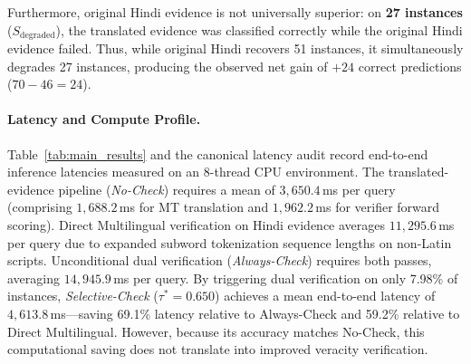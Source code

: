 Furthermore, original Hindi evidence is not universally superior: on \textbf{27 instances} ($S_{\text{degraded}}$), the translated evidence was classified correctly while the original Hindi evidence failed. Thus, while original Hindi recovers 51 instances, it simultaneously degrades 27 instances, producing the observed net gain of $+24$ correct predictions ($70 - 46 = 24$).

\paragraph{Latency and Compute Profile.}
Table~\ref{tab:main_results} and the canonical latency audit record end-to-end inference latencies measured on an 8-thread CPU environment. The translated-evidence pipeline (\emph{No-Check}) requires a mean of $3,650.4$\,ms per query (comprising $1,688.2$\,ms for MT translation and $1,962.2$\,ms for verifier forward scoring). Direct Multilingual verification on Hindi evidence averages $11,295.6$\,ms per query due to expanded subword tokenization sequence lengths on non-Latin scripts. Unconditional dual verification (\emph{Always-Check}) requires both passes, averaging $14,945.9$\,ms per query. By triggering dual verification on only 7.98\% of instances, \emph{Selective-Check} ($\tau^*=0.650$) achieves a mean end-to-end latency of $4,613.8$\,ms---saving 69.1\% latency relative to Always-Check and 59.2\% relative to Direct Multilingual. However, because its accuracy matches No-Check, this computational saving does not translate into improved veracity verification.
